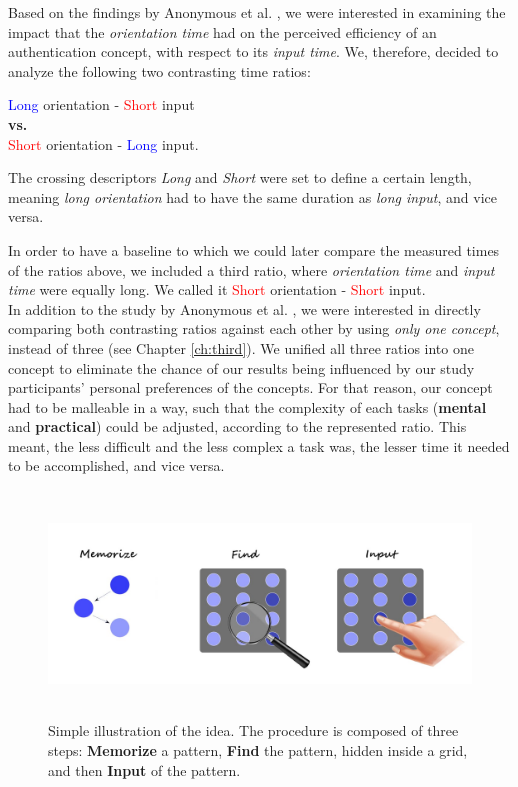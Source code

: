 Based on the findings by Anonymous et al. \cite{anonymous}, we were interested in examining the impact that the \textit{orientation time} had on the perceived efficiency of an authentication concept, with respect to its \textit{input time}. We, therefore, decided to analyze the following two contrasting time ratios:  
\begin{center}
    \textcolor{blue}{Long} orientation - \textcolor{red}{Short} input \\
    \textbf{vs.} \\
    \textcolor{red}{Short} orientation - \textcolor{blue}{Long} input.
\end{center} 

The crossing descriptors \textit{Long} and \textit{Short} were set to define a certain length, meaning \textit{long orientation} had to have the same duration as \textit{long input}, and vice versa. 

In order to have a baseline to which we could later compare the measured times of the ratios above, we included a third ratio, where \textit{orientation time} and \textit{input time} were equally long. We called it \textcolor{red}{Short} orientation - \textcolor{red}{Short} input. \\
 

In addition to the study by Anonymous et al. \cite{anonymous}, we were interested in directly comparing both contrasting ratios against each other by using \textit{only one concept}, instead of three (see Chapter \ref{ch:third}). We unified all three ratios into one concept to eliminate the chance of our results being influenced by our study participants' personal preferences of the concepts.
For that reason, our concept had to be malleable in a way, such that the complexity of each tasks (\textbf{mental} and \textbf{practical}) could be adjusted, according to the represented ratio. This meant, the less difficult and the less complex a task was, the lesser time it needed to be accomplished, and vice versa. 

\begin{figure}[t!]
\centering
\includegraphics[width=15cm, height=6cm]{Chapters/graphics/ConceptIdea.jpeg}
\caption{Simple illustration of the idea. The procedure is composed of three steps: \textbf{Memorize} a pattern, \textbf{Find} the pattern, hidden inside a grid, and then \textbf{Input} of the pattern.}
\label{fig:concept}
\end{figure}


